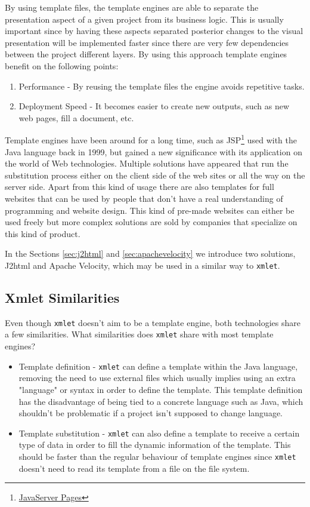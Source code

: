\noindent
By using template files, the template engines are able to separate the presentation aspect of a given project from its business logic. This is usually important since by having these aspects separated posterior changes to the visual presentation will be implemented faster since there are very few dependencies between the project different layers. By using this approach template engines benefit on the following points:

\begin{enumerate}
\item Performance - By reusing the template files the engine avoids repetitive tasks.
\item Deployment Speed - It becomes easier to create new outputs, such as new web pages, fill a document, etc.
\end{enumerate}

\noindent
Template engines have been around for a long time, such as \ac{JSP}\footnote{\href{http://www.oracle.com/technetwork/java/javaee/jsp/index.html} {JavaServer Pages}} used with the Java language back in 1999, but gained a new significance with its application on the world of Web technologies. Multiple solutions have appeared that run the substitution process either on the client side of the web sites or all the way on the server side. Apart from this kind of usage there are also templates for full websites that  can be used by people that don't have a real understanding of programming and website design. This kind of pre-made websites can either be used freely but more complex solutions are sold by companies that specialize on this kind of product. 

\noindent
In the Sections \ref{sec:j2html} and \ref{sec:apachevelocity} we introduce two solutions, J2html and Apache Velocity, which may be used in a similar way to \texttt{xmlet}.

\subsection{Xmlet Similarities}
\label{sec:similarities}

Even though \texttt{xmlet} doesn't aim to be a template engine, both technologies share a few similarities. What similarities does \texttt{xmlet} share with most template engines?

\begin{itemize}
	\item Template definition - \texttt{xmlet} can define a template within the Java language, removing the need to use external files which usually implies using an extra "language" or syntax in order to define the template. This template definition has the disadvantage of being tied to a concrete language such as Java, which shouldn't be problematic if a project isn't supposed to change language. 
	\item Template substitution - \texttt{xmlet} can also define a template to receive a certain type of data in order to fill the dynamic information of the template. This should be faster than the regular behaviour of template engines since \texttt{xmlet} doesn't need to read its template from a file on the file system.
\end{itemize}

